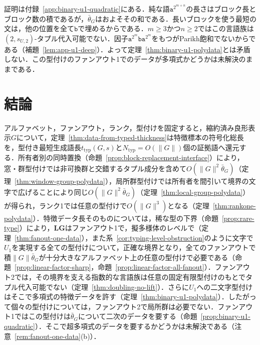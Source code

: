 \documentclass[11pt,a4paper]{ltjsarticle}
\numberwithin{equation}{section}
\theoremstyle{plain}
\theoremstyle{definition}
\theoremstyle{remark}
\begin{document}
証明は付録~\ref{app:binary-u1-quadratic}にある．純な語$\mathtt a^{2^{m+n}}$の長さはブロック長とブロック数の積であるが，$\bar\theta_G$はおよそその和である．長いブロックを使う最短の文は，他の位置を全て$\mathtt b$で埋めるからである．$m\ge3$かつ$n\ge2$ではこの言語族は$(2,s_{U,2})$-タプル代入可能でない．因子$\mathtt a^{2^m}\mathtt b\mathtt a^{2^m}$をもつがParikh飽和でないからである（補題~\ref{lem:app-u1-deep}）．よって定理~\ref{thm:binary-u1-polydata}とは矛盾しない．この型付けのファンアウト1でのデータが多項式かどうかは未解決のままである．

\section{結論}
\label{sec:conclusion}

アルファベット，ファンアウト，ランク，型付けを固定すると，縮約済み良形表示$G$について，定理~\ref{thm:data-from-typed-thickness}は特徴標本の符号化総長を，型付き最短生成語長$t_{\mathrm{typ}}(G,s)$と$N_{\mathrm{typ}}=O(\|G\|)$個の証拠語へ還元する．所有者別の同時置換（命題~\ref{prop:block-replacement-interface}）により，窓・群型付けでは非可換群と交錯するタプル成分を含めて$O(\|G\|^2\bar\theta_G)$（定理~\ref{thm:window-group-polydata}），局所群型付けでは所有者を間引いて境界の文字で広げることにより同じ$O(\|G\|^2\bar\theta_G)$（定理~\ref{thm:local-group-polydata}）が得られ，ランク1では任意の型付けで$O(\|G\|^3)$となる（定理~\ref{thm:rankone-polydata}）．特徴データ長そのものについては，稀な型の下界（命題~\ref{prop:rare-type}）により，$\mathbf{LG}$はファンアウト1で，擬多様体のレベルで（定理~\ref{thm:fanout-one-data}），また系~\ref{cor:typing-level-obstruction}のように文字で$U_1$を実現する全ての型付けについて，正確な境界となり，全てのファンアウトで積$\|G\|\bar\theta_G$が十分大きなアルファベット上の任意の型付けで必要である（命題~\ref{prop:linear-factor-sharp}，命題~\ref{prop:linear-factor-all-fanout}）．ファンアウト2では，その境界を支える指数的な言語族は任意の固定有限型付けのもとでタプル代入可能でない（定理~\ref{thm:doubling-no-lift}）．さらに$U_1$への二文字型付けはそこで多項式の特徴データを許す（定理~\ref{thm:binary-u1-polydata}）．したがって個々の型付けについては，ファンアウト2で局所群は必要でない．ファンアウト1ではこの型付けは$\bar\theta_G$について二次のデータを要する（命題~\ref{prop:binary-u1-quadratic}）．そこで超多項式のデータを要するかどうかは未解決である（注意~\ref{rem:fanout-one-data}(b)）．
\end{document}
